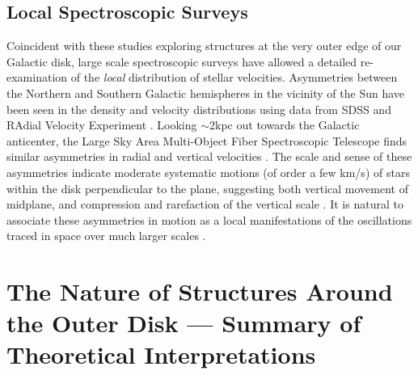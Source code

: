 \documentclass[galaxies,article,submit,moreauthors,pdftex,10pt,a4paper]{mdpi}
\begin{document}
\subsection{Local Spectroscopic Surveys}


Coincident with these studies exploring structures at the very outer edge of our Galactic disk,
large scale spectroscopic surveys have allowed a detailed re-examination of the {\it local} distribution of stellar velocities.
Asymmetries between the Northern and Southern Galactic hemispheres in the vicinity of the Sun have been seen in the density and velocity distributions using data from SDSS \cite{widrow12,yanny13} and RAdial Velocity Experiment \cite[RAVE, see][]{??,williams13}.
Looking $\sim$2kpc out towards the Galactic anticenter, the Large Sky Area Multi-Object Fiber Spectroscopic Telescope \cite[LAMOST,][]{cui12,deng12,zhao12} finds similar asymmetries in radial and vertical velocities \cite{carlin13}.
The scale and sense of these asymmetries indicate moderate systematic motions (of order a few km/s)  of stars within the disk perpendicular to the plane,  suggesting both vertical movement of midplane, and compression and rarefaction of the vertical scale \cite[referred to as ``bending'' and ``breathing'' modes respectively --- see,][]{widrow14}.
It is natural to associate these asymmetries in motion as a local manifestations of the oscillations traced in space over much larger scales \cite{xu15,pricewhelan15}.


\section{The Nature of Structures Around the Outer Disk --- Summary of Theoretical Interpretations}
\label{sec:theory}
\end{document}
